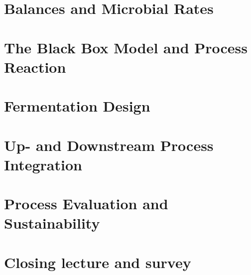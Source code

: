 \documentclass[]{beamer}
\begin{document}
\begin{CJK}{UTF8}{gbsn}
\begin{frame}[shrink] {}
\end{frame}
\section{Balances and Microbial Rates}
\section{The Black Box Model and Process Reaction}
\section{Fermentation Design}
\section{Up- and Downstream Process Integration}
\section{Process Evaluation and Sustainability}
\section{Closing lecture and survey}

\end{CJK}
\end{document}
